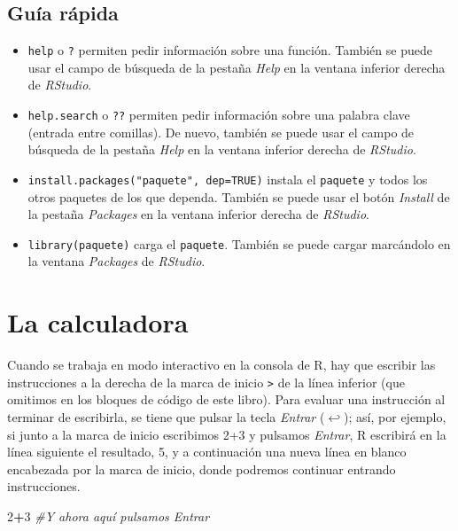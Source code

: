 \documentclass[]{book}
\newenvironment{Shaded}{\begin{snugshade}}{\end{snugshade}}
\newcommand{\CommentTok}[1]{\textcolor[rgb]{0.56,0.35,0.01}{\textit{#1}}}
\newcommand{\DecValTok}[1]{\textcolor[rgb]{0.00,0.00,0.81}{#1}}
\newcommand{\OperatorTok}[1]{\textcolor[rgb]{0.81,0.36,0.00}{\textbf{#1}}}
\providecommand{\tightlist}{%
  \setlength{\itemsep}{0pt}\setlength{\parskip}{0pt}}
\theoremstyle{definition}
\theoremstyle{definition}
\theoremstyle{definition}
\theoremstyle{remark}
\begin{document}
\hypertarget{guia-rapida}{%
\section{Guía rápida}\label{guia-rapida}}

\begin{itemize}
\tightlist
\item
  \texttt{help} o \texttt{?} permiten pedir información sobre una función. También se puede usar el campo de búsqueda de la pestaña \emph{Help} en la ventana inferior derecha de \emph{RStudio}.
\item
  \texttt{help.search} o \texttt{??} permiten pedir información sobre una palabra clave (entrada entre comillas). De nuevo, también se puede usar el campo de búsqueda de la pestaña \emph{Help} en la ventana inferior derecha de \emph{RStudio}.
\item
  \texttt{install.packages("paquete",\ dep=TRUE)} instala el \texttt{paquete} y todos los otros paquetes de los que dependa. También se puede usar el botón \emph{Install} de la pestaña \emph{Packages} en la ventana inferior derecha de \emph{RStudio}.
\item
  \texttt{library(paquete)} carga el \texttt{paquete}. También se puede cargar marcándolo en la ventana \emph{Packages} de \emph{RStudio}.
\end{itemize}

\hypertarget{chap:calc}{%
\chapter{La calculadora}\label{chap:calc}}

Cuando se trabaja en modo interactivo en la consola de R, hay que escribir las instrucciones a la derecha de la marca de inicio \texttt{\textgreater{}} de la línea inferior (que omitimos en los bloques de código de este libro).
Para evaluar una instrucción al terminar de escribirla, se tiene que pulsar la tecla \emph{Entrar} (\(\hookleftarrow\)); así, por ejemplo, si junto a la marca de inicio escribimos 2+3 y pulsamos \emph{Entrar}, R escribirá en la línea siguiente el resultado, 5, y a continuación una nueva línea en blanco encabezada por la marca de inicio, donde podremos continuar entrando instrucciones.

\begin{Shaded}
\begin{Highlighting}[]
\DecValTok{2}\OperatorTok{+}\DecValTok{3} \CommentTok{#Y ahora aquí pulsamos Entrar}
\end{Highlighting}
\end{Shaded}
\end{document}
